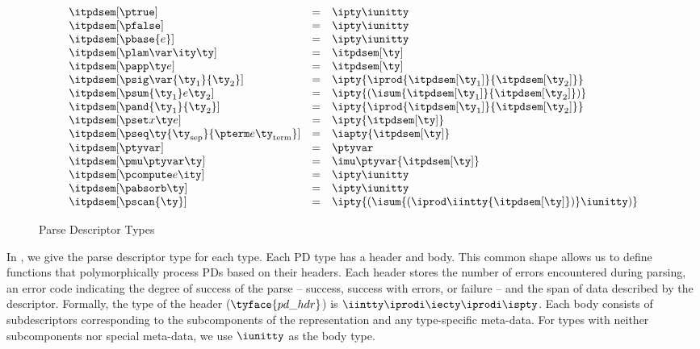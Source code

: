 \begin{figure}
\fbox{$\itpdsem[\ty] = \ity$}
\[ 
\begin{array}{lcl} 
\itpdsem[\ptrue] & = & \ipty \iunitty \\                                                  
\itpdsem[\pfalse] & = & \ipty \iunitty \\                                                  
\itpdsem[\pbase{e}] & = & \ipty \iunitty\\
\itpdsem[\plam \var \ity \ty] & = & \itpdsem[\ty] \\
\itpdsem[\papp \ty e] & = & \itpdsem[\ty] \\
\itpdsem[\psig \var {\ty_1} {\ty_2}] & = & 
               \ipty {\iprod {\itpdsem[\ty_1]} {\itpdsem[\ty_2]}} \\
\itpdsem[\psum {\ty_1} e {\ty_2}] & = & 
               \ipty {(\isum {\itpdsem[\ty_1]} {\itpdsem[\ty_2]})} \\
\itpdsem[\pand {\ty_1} {\ty_2}] & = & \ipty {\iprod {\itpdsem[\ty_1]} {\itpdsem[\ty_2]}}    \\
\itpdsem[\pset x \ty e] & = & \ipty {\itpdsem[\ty]} \\
\itpdsem[\pseq \ty {\ty_{\text{sep}}} {\pterm e {\ty_{\text{term}}}}] & = & 
  \iapty {\itpdsem[\ty]} \\
\itpdsem[\ptyvar] & = & \ptyvar \\
\itpdsem[\pmu \ptyvar \ty] & = & \imu \ptyvar {\itpdsem[\ty]} \\
\itpdsem[\pcompute e \ity]            & = & \ipty \iunitty \\
\itpdsem[\pabsorb \ty]                & = & \ipty \iunitty \\
\itpdsem[\pscan{\ty}] & = & \ipty {(\isum {(\iprod \iintty
    {\itpdsem[\ty]})} \iunitty)}
\end{array}
\]
\caption{Parse Descriptor Types}
\label{fig:pd-tys}
\end{figure}

In , we give the parse descriptor
type for each \ddc{} type. Each PD type has a header and body.
This common shape allows us to define functions that polymorphically
process PDs based on their headers. Each header stores the number of
errors encountered during parsing, an error code indicating the degree
of success of the parse -- success, success with errors, or failure --
and the span of data described by the descriptor.  Formally, the type
of the header  ($\tyface{pd\_hdr}$) is $\iintty \iprodi \iecty \iprodi
\ispty$.  Each body consists of subdescriptors corresponding to the
subcomponents of the representation and any type-specific meta-data. For types with neither subcomponents nor special meta-data, we
use $\iunitty$ as the body type.

